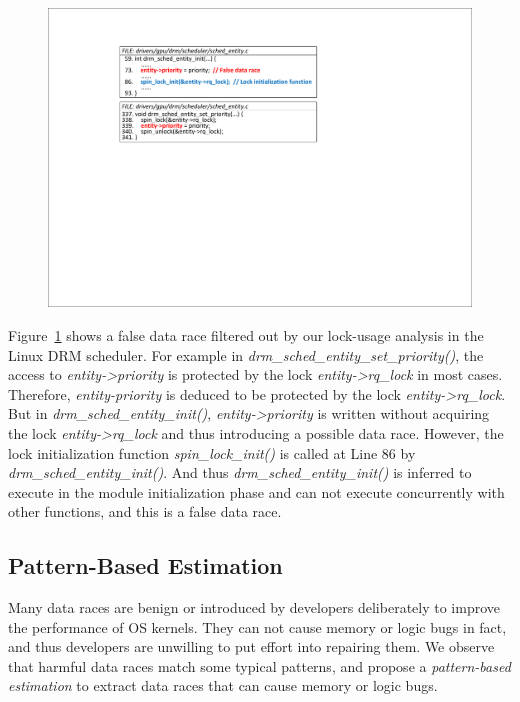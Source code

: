 \begin{figure}[htbp]
	\centering
	\includegraphics[width=0.9\linewidth]{figures/fig_demo_lock_usage.pdf}
	\label{fig_demo_lock_usage}
\end{figure}

 Figure~\ref{fig_demo_lock_usage} shows a false 
data race filtered out by our lock-usage analysis in the Linux DRM scheduler. 
For example in {\em drm\_sched\_entity\_set\_priority()}, the access to {\em 
entity->priority} is protected by the lock {\em entity->rq\_lock} in most 
cases. Therefore, {\em entity-priority} is deduced to be protected by the lock 
{\em entity->rq\_lock}. But in {\em drm\_sched\_entity\_init()}, {\em 
entity->priority} is written without acquiring the lock {\em entity->rq\_lock} 
and thus introducing a possible data race. However, the lock initialization 
function {\em spin\_lock\_init()} is called at Line 86 by {\em 
drm\_sched\_entity\_init()}. And thus {\em drm\_sched\_entity\_init()} is 
inferred to execute in the module initialization phase and can not execute 
concurrently with other functions, and this is a false data race.

\subsection{Pattern-Based Estimation}
\label{subsec_estimation}
Many data races are benign or introduced by developers deliberately to improve 
the performance of OS kernels. They can not cause memory or logic bugs in fact, 
and thus developers are unwilling to put effort into repairing them. We observe 
that harmful data races match some typical patterns, and propose a {\em 
pattern-based estimation} to extract data races that can cause memory or logic 
bugs.

